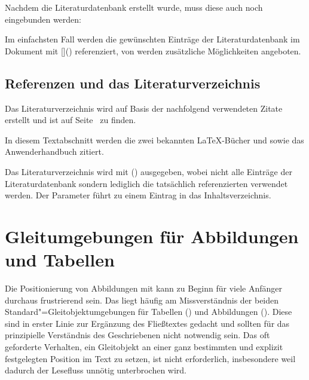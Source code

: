 \documentclass[%
  english,ngerman,%
  cdgeometry=no,DIV=12,%
  automark,%
  listof=toc,%
]{tudscrartcl}
\begin{document}
\begingroup%
\makeatletter
\appto\filec@ntents@nosearch{\filec@ntents@force\filec@ntents@silent}
\InputCode
\endgroup
%
Nachdem die Literaturdatenbank erstellt wurde, muss diese auch noch eingebunden 
werden:
%
\begin{Preamble}


\end{Preamble}
%
Im einfachsten Fall werden die gewünschten Einträge der Literaturdatenbank im 
Dokument mit []() referenziert, 
von  werden zusätzliche Möglichkeiten angeboten.
%
\begin{refsection}
\begin{Trunk+}
\section{Referenzen und das Literaturverzeichnis}
Das Literaturverzeichnis wird auf Basis der nachfolgend verwendeten 
Zitate erstellt und ist auf Seite~\pageref{sec:bibliography} zu finden.
\end{Trunk+}
\begin{Trunk*}
In diesem Textabschnitt werden die zwei bekannten \LaTeX-Bücher
\cite{knuth84} und \cite{goossens94} sowie das Anwenderhandbuch
\cite{hanisch19} zitiert.

\end{Trunk*}
%
Das Literaturverzeichnis wird mit () 
ausgegeben, wobei nicht alle Einträge der Literaturdatenbank sondern lediglich 
die tatsächlich referenzierten verwendet werden. Der Parameter 
 führt zu einem Eintrag in das Inhaltsverzeichnis.
%
\begin{Hint}
\printbibliography[heading=bibintoc]
\end{Hint}
\begin{quoting}[rightmargin=0pt]
\makeatletter
\let\markboth\@gobbletwo
\let\markright\@gobble
\makeatother
\printbibliography
\end{quoting}
\end{refsection}



\section{Gleitumgebungen für Abbildungen und Tabellen}
\label{sec:floats}%
%
Die Positionierung von Abbildungen mit  kann zu Beginn für viele 
Anfänger durchaus frustrierend sein. Das liegt häufig am Missverständnis der 
beiden Standard"=Gleitobjektumgebungen für Tabellen () und 
Abbildungen (). Diese sind in erster Linie zur Ergänzung 
des Fließtextes gedacht und sollten für das prinzipielle Verständnis des 
Geschriebenen nicht notwendig sein. Das oft geforderte Verhalten, ein 
Gleitobjekt an einer ganz bestimmten und explizit festgelegten Position im Text 
zu setzen, ist nicht erforderlich, insbesondere weil dadurch der Lesefluss 
unnötig unterbrochen wird. 
\end{document}
